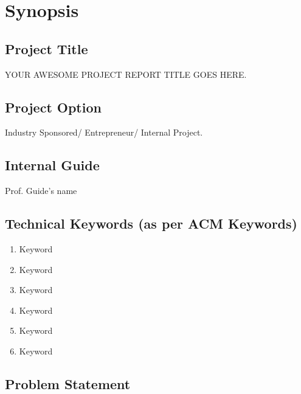 \documentclass{report} %
\renewcommand{\headrulewidth}{0pt}
\renewcommand{\footrulewidth}{0pt}
\begin{document}
	\lhead{} %
	\rhead{} %
	\renewcommand{\headrulewidth}{1pt} %
	
	\renewcommand{\footrulewidth}{1pt} %
	\fancyfoot[R]{\thepage}
	\setcounter{page}{1}
	
	\chapter{Synopsis}
		\pagebreak
		\section{Project Title}
			YOUR AWESOME PROJECT REPORT TITLE GOES HERE. \\
		
		\section{Project Option}
			Industry Sponsored/ Entrepreneur/ Internal Project. \\
		
		\section{Internal Guide}
			Prof. Guide's name \\
		
		\section{Technical Keywords (as per ACM Keywords)}
			\begin{enumerate}
				\item Keyword 
				\item Keyword 
				\item Keyword 
				\item Keyword 
				\item Keyword 
				\item Keyword 
			\end{enumerate}
		
		\section{Problem Statement}
		\lipsum[4]
		
\end{document}
